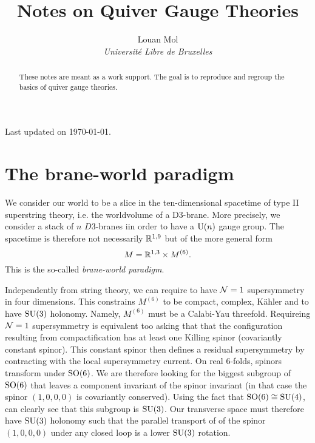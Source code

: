\documentclass[a4paper,11pt]{article}
\title{\textbf{Notes on Quiver Gauge Theories}}
\author{Louan Mol\\ \textit{Université Libre de Bruxelles}}
\date{}
\begin{document}
\begin{titlepage}
    
    \maketitle

    \thispagestyle{empty}

    \vspace{2cm}

    \begin{abstract}
        These notes are meant as a work support. The goal is to reproduce and regroup the basics of quiver gauge theories. 
    \end{abstract}

    \vfill

    \hfill Last updated on \today.
    
\end{titlepage}
  
\pagebreak

\tableofcontents

\pagebreak

\nocite{*}

\section{The brane-world paradigm}

    We consider our world to be a slice in the ten-dimensional spacetime of type II superstring theory, i.e. the worldvolume of a D$3$-brane. More precisely, we consider a stack of $n$ $D$3-branes iin order to have a $\text{U}(n)$ gauge group. The spacetime is therefore not necessarily $\mathbb{R}^{1,9}$ but of the more general form
    \begin{equation*}
        M = \mathbb{R}^{1,3}\times M^{(6)}.
    \end{equation*}
    This is the so-called \emph{brane-world paradigm}.
    
    Independently from string theory, we can require to have $\mathcal{N}=1$ supersymmetry in four dimensions. This constrains $M^{(6)}$ to be compact, complex, Kähler and to have $\text{SU}(3)$ holonomy. Namely, $M^{(6)}$ must be a Calabi-Yau threefold. Requireing $\mathcal{N}=1$ supersymmetry is equivalent too asking that that the configuration resulting from compactification has at least one Killing spinor (covariantly constant spinor). This constant spinor then defines a residual supersymmetry by contracting with the local supersymmetry current. On real $6$-folds, spinors transform under $\text{SO}(6)$. We are therefore looking for the biggest subgroup of $\text{SO}(6)$ that leaves a component invariant of the spinor invariant (in that case the spinor $(1,0,0,0)$ is covariantly conserved). Using the fact that $\text{SO}(6)\cong\text{SU}(4)$, can clearly see that this subgroup is $\text{SU}(3)$. Our transverse space must therefore have $\text{SU}(3)$ holonomy such that the parallel transport of of the spinor $(1,0,0,0)$ under any closed loop is a lower $\text{SU}(3)$ rotation.
    
\end{document}
